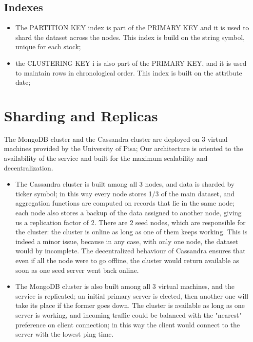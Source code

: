 \subsection{Indexes}
\begin{itemize}
    \item 
The PARTITION KEY index is part of the PRIMARY KEY and it is used to shard the dataset across
the nodes. This index is build on the string symbol, unique for each stock;
    \item
the CLUSTERING KEY i is also part of the PRIMARY KEY, and it is used to maintain rows in
chronological order. This index is built on the attribute date;
\end{itemize}
\section{Sharding and Replicas}
The MongoDB cluster and the Cassandra cluster are deployed on 3 virtual machines provided
by the University of Pisa; 
Our architecture is oriented to the availability of the service and built for the maximum
scalability and decentralization.
\begin{itemize}
    \item 
The Cassandra cluster is built among all 3 nodes, and data is sharded by ticker symbol;
in this way every node stores 1/3 of the main dataset, and aggregation functions are computed
on records that lie in the same node; each node also stores a backup of the data
assigned to another node, giving us a replication factor of 2. There are 2 seed nodes,
which are responsible for the cluster: the cluster is online as long as one of them keeps
working. This is indeed a minor issue, because in any case, with only one node, the dataset 
would by incomplete. The decentralized behaviour of Cassandra ensures that
even if all the node were to go offline, the cluster would return available as soon as one seed server went back
online. 
    \item
The MongoDB cluster is also built among all 3 virtual machines, and the service is replicated;
an initial primary server is elected, then another one will take its place if the former goes down. 
The cluster is available as long as one server is working, and incoming traffic could be balanced
with the "nearest" preference on client connection; in this way the client would connect to the
server with the lowest ping time.

\end{itemize}
